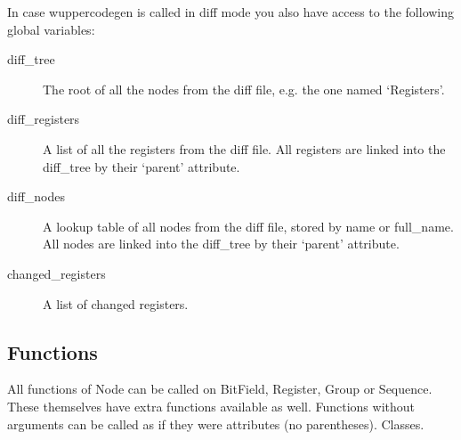 \documentclass[letterpaper,10pt,english]{sphinxmanual}
\begin{document}
In case wuppercodegen is called in \sphinxquotedblleft{}diff\sphinxquotedblright{} mode you also have access to the following global variables:
\begin{description}
\item[{diff\_tree}] \leavevmode
The root of all the nodes from the diff file, e.g. the one named `Registers'.

\item[{diff\_registers}] \leavevmode
A list of all the registers from the diff file. All registers are linked into the diff\_tree by
their `parent' attribute.

\item[{diff\_nodes}] \leavevmode
A lookup table of all nodes from the diff file, stored by name or full\_name. All nodes are linked
into the diff\_tree by their `parent' attribute.

\item[{changed\_registers}] \leavevmode
A list of changed registers.

\end{description}


\subsection{Functions}
\label{\detokenize{developer:functions}}
All functions of Node can be called on BitField, Register, Group or Sequence.
These themselves have extra functions available as well.
Functions without arguments can be called as if they were attributes (no parentheses).
\label{\detokenize{developer:module-wuppercodegen.classes}}
Classes.
\end{document}
